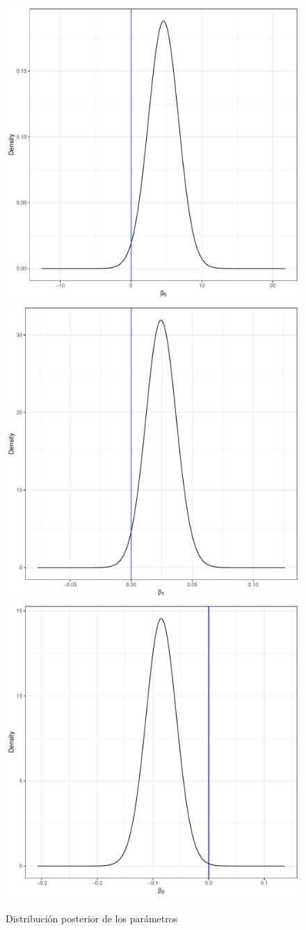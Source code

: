 \documentclass[a4paper,12pt]{report}
\begin{document}
\newpage
\begin{figure}[hbtp]
\centering
\includegraphics[width=.48\textwidth]{FF31.pdf}
\includegraphics[width=.48\textwidth]{FF32.pdf}
\includegraphics[width=.48\textwidth]{FF33.pdf}
\caption{Distribución posterior de los parámetros}
\end{figure}
\newpage
\end{document}
